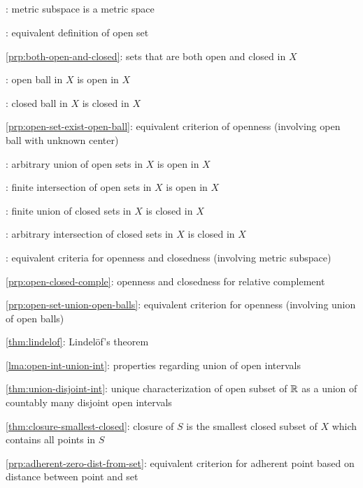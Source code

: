 \subsection*{}
\item {}: metric subspace is a metric space
\item {}: equivalent definition of open set
\item \cref{prp:both-open-and-closed}: sets that are both open and closed in \(X\)
\item {}: open ball in \(X\) is open in \(X\)
\item {}: closed ball in \(X\) is closed in \(X\)
\item \cref{prp:open-set-exist-open-ball}: equivalent criterion of openness (involving open ball with unknown center)
\item {}: arbitrary union of open sets in \(X\) is open in \(X\)
\item {}: finite intersection of open sets in \(X\) is open in \(X\)
\item {}: finite union of closed sets in \(X\) is closed in \(X\)
\item {}: arbitrary intersection of closed sets in \(X\) is closed in \(X\)
\item {}: equivalent criteria for
openness and closedness (involving metric subspace)
\item \cref{prp:open-closed-comple}: openness and closedness for relative complement
\item \cref{prp:open-set-union-open-balls}: equivalent criterion for openness (involving union of open balls)
\item \cref{thm:lindelof}: Lindel\"of's theorem
\item \cref{lma:open-int-union-int}: properties regarding union of open intervals
\item \cref{thm:union-disjoint-int}: unique characterization of open subset of
\(\mathbb{R}\) as a union of countably many disjoint open intervals
\item \cref{thm:closure-smallest-closed}: closure of \(S\) is the smallest closed subset of \(X\) which contains all points in \(S\)
\item \cref{prp:adherent-zero-dist-from-set}: equivalent criterion for adherent point based on distance between point and set
